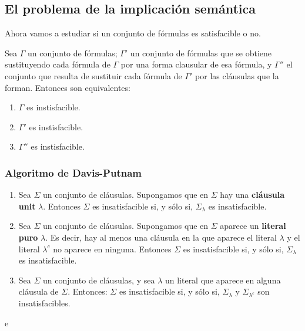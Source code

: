 \subsection{El problema de la implicación semántica}
Ahora vamos a estudiar si un conjunto de fórmulas es satisfacible o no.
\begin{nth}
    Sea $\Gamma$ un conjunto de fórmulas; $\Gamma'$ un conjunto de fórmulas que se obtiene sustituyendo cada fórmula de $\Gamma$ por una forma clausular de esa fórmula, y $\Gamma''$ el conjunto que resulta de sustituir cada fórmula de $\Gamma'$ por las cláusulas que la forman. Entonces son equivalentes:
    \begin{enumerate}
        \item $\Gamma$ es instisfacible.
        \item $\Gamma'$ es instisfacible.
        \item $\Gamma''$ es instisfacible.
    \end{enumerate}
\end{nth}

\subsubsection{Algoritmo de Davis-Putnam}
\begin{enumerate}
    \item Sea $\Sigma$ un conjunto de cláusulas. Supongamos que en $\Sigma$ hay una \textbf{cláusula unit} $\lambda$. Entonces $\Sigma$ es insatisfacible si, y sólo si, $\Sigma_\lambda$ es insatisfacible.
    \item Sea $\Sigma$ un conjunto de cláusulas. Supongamos que en $\Sigma$ aparece un \textbf{literal puro} $\lambda$. Es decir, hay al menos una cláusula en la que aparece el literal $\lambda$ y el literal $\lambda^c$ no aparece en ninguna. Entonces $\Sigma$ es insatisfacible si, y sólo si, $\Sigma_\lambda$ es insatisfacible.
    \item Sea $\Sigma$ un conjunto de cláusulas, y sea $\lambda$ un literal que aparece en alguna cláusula de $\Sigma$. Entonces: $\Sigma$ es insatisfacible si, y sólo si, $\Sigma_\lambda$ y $\Sigma_{\lambda^c}$ son insatisfacibles.
\end{enumerate}
\begin{ejemplo}
    e
\end{ejemplo}

